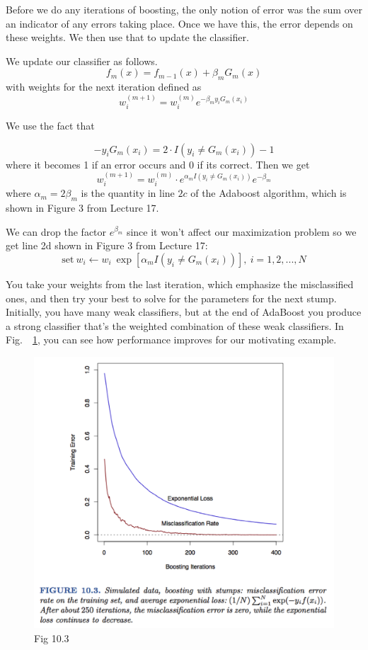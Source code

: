 \documentclass[a4paper]{article}
\begin{document}
Before we do any iterations of boosting, the only notion of error was the sum over an indicator of any errors taking place.  Once we have this, the error depends on these weights.  We then use that to update the classifier.

We update our classifier as follows.
$$f_m(x) = f_{m-1}(x) + \beta_m G_m(x) $$
with weights for the next iteration defined as
$$w_i^{(m+1)} = w_i^{(m)} e^{-\beta_m y_i G_m(x_i)}$$

We use the fact that 

$$-y_i G_m(x_i) = 2 \cdot I(y_i \neq G_m(x_i)) - 1$$
where it becomes 1 if an error occurs and 0 if its correct. Then we get
$$w_i^{(m+1)} = w_i^{(m)} \cdot e^{\alpha_m I(y_i \neq G_m(x_i))} e^{-\beta_m}$$
where $\alpha_m = 2 \beta_m$ is the quantity in line $2c$ of the Adaboost algorithm, which is shown in Figure 3 from Lecture 17.

We can drop the factor $e^{\beta_m}$ since it won't affect our maximization problem so we get line 2d shown in Figure 3 from Lecture 17: 
$$
\text{set} \: w_i \leftarrow w_i \: \exp[\alpha_m I(y_i \neq G_m(x_i))], \: i = 1, 2, ..., N
$$

You take your weights from the last iteration, which emphasize the misclassified ones, and then try your best to solve for the parameters for the next stump.  Initially, you have many weak classifiers, but at the end of AdaBoost you produce a strong classifier that's the weighted combination of these weak classifiers.  In Fig.\ ~\ref{fig:boost3}, you can see how performance improves for our motivating example.

\begin{figure}
\centering
\includegraphics[width=1.0\textwidth]{fig10_3.png}
\caption{\label{fig:boost3}Fig 10.3}
\end{figure}
\end{document}

